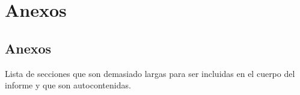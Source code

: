 \chapter{Anexos}
\label{chapter:Anexos}


\newpage
\section{Anexos}



Lista de secciones que son demasiado largas para ser incluidas en el cuerpo del informe y que son autocontenidas.
